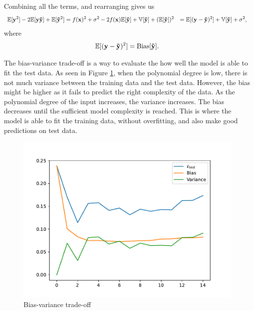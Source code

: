 Combining all the terms, and rearranging gives us
\begin{align*}
    \mathbb{E} [ \mathbf{y}^{2} ] - 2 \mathbb{E} [ \mathbf{y} \mathbf{\Tilde{y}} ] + \mathbb{E} [ \mathbf{\Tilde{y}}^{2} ] &= f(\mathbf{x})^{2} + \sigma^{2} - 2 f(\mathbf{x}) \mathbb{E} [ \mathbf{\Tilde{y}} ] + \mathbb{V}[\mathbf{\Tilde{y}}] + (\mathbb{E} [ \mathbf{\Tilde{y}} ])^{2} 
    &= \mathbb{E} [ (\mathbf{y} - \mathbf{\Tilde{y}})^{2} ] + \mathbb{V}[\mathbf{\Tilde{y}}] + \sigma^{2} , 
\end{align*}
where 
\begin{align*}
    \mathbb{E} [ (\mathbf{y} - \mathbf{\Tilde{y}})^{2} ] = \text{Bias}[\mathbf{\Tilde{y}}]. 
\end{align*}

The bias-variance trade-off is a way to evaluate the how well the model is able to fit the test data. As seen in Figure \ref{fig:bias-variance}, when the polynomial degree is low, there is not much variance between the training data and the test data. However, the bias might be higher as it fails to predict the right complexity of the data. As the polynomial degree of the input increases, the variance increases. The bias decreases until the sufficient model complexity is reached. This is where the model is able to fit the training data, without overfitting, and also make good predictions on test data. 

\begin{figure}
    \centering
    \includegraphics[width=0.5\linewidth]{latex/figures/ex38_noise.pdf}
    \caption{Bias-variance trade-off}
    \label{fig:bias-variance}
\end{figure}

\newpage

